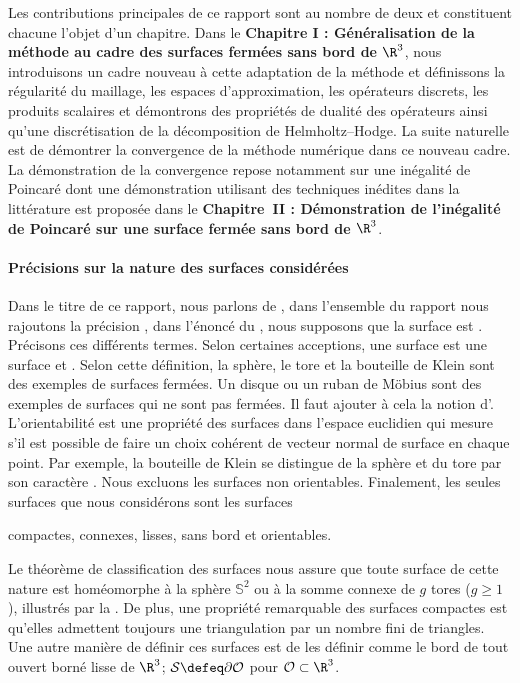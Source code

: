 Les contributions principales de ce rapport sont au nombre de deux et constituent chacune l'objet d'un chapitre. Dans le \textbf{Chapitre I : Généralisation de la méthode \ddfv au cadre des surfaces fermées sans bord de $\R^3$}, nous introduisons un cadre nouveau à cette adaptation de la méthode et définissons la régularité du maillage, les espaces d'approximation, les opérateurs discrets, les produits scalaires et démontrons des propriétés de dualité des opérateurs ainsi qu'une discrétisation de la décomposition de Helmholtz--Hodge. La suite naturelle est de démontrer la convergence de la méthode numérique dans ce nouveau cadre. La démonstration de la convergence repose notamment sur une inégalité de Poincaré dont une démonstration utilisant des techniques inédites dans la littérature \ddfv est proposée dans le \textbf{Chapitre~II : Démonstration de l'inégalité de Poincaré \ddfv sur une surface fermée sans bord de $\R^3$}.

\paragraph{Précisions sur la nature des surfaces considérées}
Dans le titre de ce rapport, nous parlons de , dans l'ensemble du rapport nous rajoutons la précision , dans l'énoncé du , nous supposons que la surface est . Précisons ces différents termes. Selon certaines acceptions, une surface  est une surface  et . Selon cette définition, la sphère, le tore et la bouteille de Klein sont des exemples de surfaces fermées. Un disque ou un ruban de Möbius sont des exemples de surfaces qui ne sont pas fermées. Il faut ajouter à cela la notion d'. L'orientabilité est une propriété des surfaces dans l'espace euclidien qui mesure s'il est possible de faire un choix cohérent de vecteur normal de surface en chaque point. Par exemple, la bouteille de Klein se distingue de la sphère et du tore par son caractère . Nous excluons les surfaces non orientables. Finalement, les seules surfaces que nous considérons sont les surfaces 
\begin{center}
compactes, connexes, lisses, sans bord et orientables.
\end{center}
Le théorème de classification des surfaces nous assure que toute surface de cette nature est homéomorphe à la sphère $\mathbb{S}^2$ ou à la somme connexe de $g$ tores ($g \geqslant 1$), illustrés par la . De plus, une propriété remarquable des surfaces compactes est qu'elles admettent toujours une triangulation par un nombre fini de triangles. Une autre manière de définir ces surfaces est de les définir comme le bord de tout ouvert borné lisse de $\R^3$; $\surflisse \defeq \partial \mathcal{O}$ pour $\mathcal{O} \subset \R^3$.

